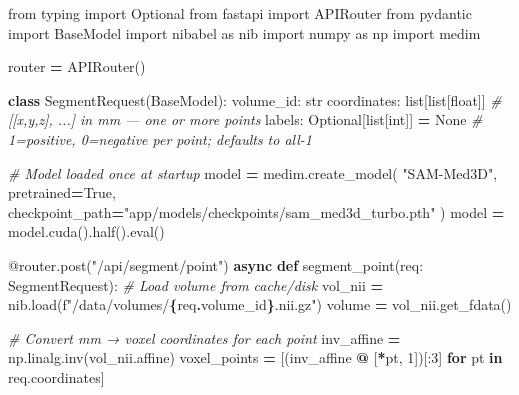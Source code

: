 \documentclass[
  11pt,
]{article}
\newenvironment{Shaded}{\begin{snugshade}}{\end{snugshade}}
\newcommand{\AttributeTok}[1]{\textcolor[rgb]{0.13,0.29,0.53}{#1}}
\newcommand{\BuiltInTok}[1]{#1}
\newcommand{\CommentTok}[1]{\textcolor[rgb]{0.56,0.35,0.01}{\textit{#1}}}
\newcommand{\ControlFlowTok}[1]{\textcolor[rgb]{0.13,0.29,0.53}{\textbf{#1}}}
\newcommand{\DecValTok}[1]{\textcolor[rgb]{0.00,0.00,0.81}{#1}}
\newcommand{\ImportTok}[1]{#1}
\newcommand{\KeywordTok}[1]{\textcolor[rgb]{0.13,0.29,0.53}{\textbf{#1}}}
\newcommand{\NormalTok}[1]{#1}
\newcommand{\OperatorTok}[1]{\textcolor[rgb]{0.81,0.36,0.00}{\textbf{#1}}}
\newcommand{\SpecialCharTok}[1]{\textcolor[rgb]{0.81,0.36,0.00}{\textbf{#1}}}
\newcommand{\SpecialStringTok}[1]{\textcolor[rgb]{0.31,0.60,0.02}{#1}}
\newcommand{\StringTok}[1]{\textcolor[rgb]{0.31,0.60,0.02}{#1}}
\newcommand{\VariableTok}[1]{\textcolor[rgb]{0.00,0.00,0.00}{#1}}
\begin{document}
\begin{Shaded}
\begin{Highlighting}[]
\ImportTok{from}\NormalTok{ typing }\ImportTok{import}\NormalTok{ Optional}
\ImportTok{from}\NormalTok{ fastapi }\ImportTok{import}\NormalTok{ APIRouter}
\ImportTok{from}\NormalTok{ pydantic }\ImportTok{import}\NormalTok{ BaseModel}
\ImportTok{import}\NormalTok{ nibabel }\ImportTok{as}\NormalTok{ nib}
\ImportTok{import}\NormalTok{ numpy }\ImportTok{as}\NormalTok{ np}
\ImportTok{import}\NormalTok{ medim}

\NormalTok{router }\OperatorTok{=}\NormalTok{ APIRouter()}

\KeywordTok{class}\NormalTok{ SegmentRequest(BaseModel):}
\NormalTok{    volume\_id: }\BuiltInTok{str}
\NormalTok{    coordinates: }\BuiltInTok{list}\NormalTok{[}\BuiltInTok{list}\NormalTok{[}\BuiltInTok{float}\NormalTok{]]   }\CommentTok{\# [[x,y,z], ...] in mm — one or more points}
\NormalTok{    labels: Optional[}\BuiltInTok{list}\NormalTok{[}\BuiltInTok{int}\NormalTok{]] }\OperatorTok{=} \VariableTok{None}  \CommentTok{\# 1=positive, 0=negative per point; defaults to all{-}1}

\CommentTok{\# Model loaded once at startup}
\NormalTok{model }\OperatorTok{=}\NormalTok{ medim.create\_model(}
    \StringTok{"SAM{-}Med3D"}\NormalTok{, pretrained}\OperatorTok{=}\VariableTok{True}\NormalTok{,}
\NormalTok{    checkpoint\_path}\OperatorTok{=}\StringTok{"app/models/checkpoints/sam\_med3d\_turbo.pth"}
\NormalTok{)}
\NormalTok{model }\OperatorTok{=}\NormalTok{ model.cuda().half().}\BuiltInTok{eval}\NormalTok{()}

\AttributeTok{@router.post}\NormalTok{(}\StringTok{"/api/segment/point"}\NormalTok{)}
\ControlFlowTok{async} \KeywordTok{def}\NormalTok{ segment\_point(req: SegmentRequest):}
    \CommentTok{\# Load volume from cache/disk}
\NormalTok{    vol\_nii }\OperatorTok{=}\NormalTok{ nib.load(}\SpecialStringTok{f"/data/volumes/}\SpecialCharTok{\{}\NormalTok{req}\SpecialCharTok{.}\NormalTok{volume\_id}\SpecialCharTok{\}}\SpecialStringTok{.nii.gz"}\NormalTok{)}
\NormalTok{    volume }\OperatorTok{=}\NormalTok{ vol\_nii.get\_fdata()}

    \CommentTok{\# Convert mm → voxel coordinates for each point}
\NormalTok{    inv\_affine }\OperatorTok{=}\NormalTok{ np.linalg.inv(vol\_nii.affine)}
\NormalTok{    voxel\_points }\OperatorTok{=}\NormalTok{ [(inv\_affine }\OperatorTok{@}\NormalTok{ [}\OperatorTok{*}\NormalTok{pt, }\DecValTok{1}\NormalTok{])[:}\DecValTok{3}\NormalTok{] }\ControlFlowTok{for}\NormalTok{ pt }\KeywordTok{in}\NormalTok{ req.coordinates]}


\end{Highlighting}
\end{Shaded}
\end{document}
